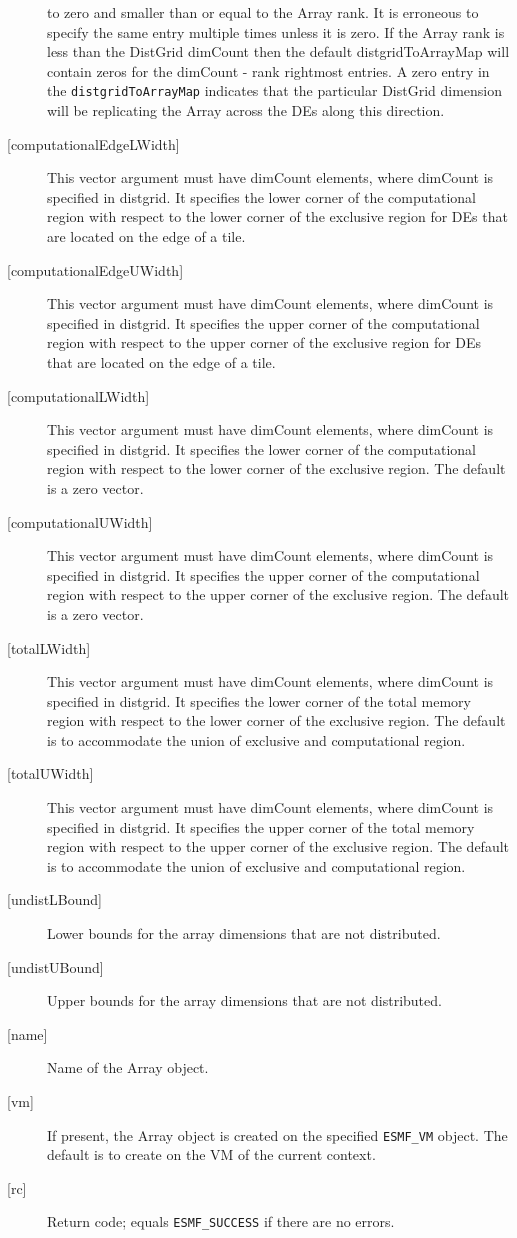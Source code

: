 \begin{description}
   to zero and smaller than or equal to the Array rank. It is erroneous
   to specify the same entry multiple times unless it is zero.
   If the Array rank is less than the DistGrid dimCount then the default
   distgridToArrayMap will contain zeros for the dimCount - rank
   rightmost entries. A zero entry in the {\tt distgridToArrayMap}
   indicates that the particular DistGrid dimension will be replicating
   the Array across the DEs along this direction.
   \item[{[computationalEdgeLWidth]}]
   This vector argument must have dimCount elements, where dimCount is
   specified in distgrid. It specifies the lower corner of the computational
   region with respect to the lower corner of the exclusive region for DEs
   that are located on the edge of a tile.
   \item[{[computationalEdgeUWidth]}]
   This vector argument must have dimCount elements, where dimCount is
   specified in distgrid. It specifies the upper corner of the computational
   region with respect to the upper corner of the exclusive region for DEs
   that are located on the edge of a tile.
   \item[{[computationalLWidth]}]
   This vector argument must have dimCount elements, where dimCount is
   specified in distgrid. It specifies the lower corner of the computational
   region with respect to the lower corner of the exclusive region.
   The default is a zero vector.
   \item[{[computationalUWidth]}]
   This vector argument must have dimCount elements, where dimCount is
   specified in distgrid. It specifies the upper corner of the computational
   region with respect to the upper corner of the exclusive region.
   The default is a zero vector.
   \item[{[totalLWidth]}]
   This vector argument must have dimCount elements, where dimCount is
   specified in distgrid. It specifies the lower corner of the total memory
   region with respect to the lower corner of the exclusive region.
   The default is to accommodate the union of exclusive and computational
   region.
   \item[{[totalUWidth]}]
   This vector argument must have dimCount elements, where dimCount is
   specified in distgrid. It specifies the upper corner of the total memory
   region with respect to the upper corner of the exclusive region.
   The default is to accommodate the union of exclusive and computational
   region.
   \item[{[undistLBound]}]
   Lower bounds for the array dimensions that are not distributed.
   \item[{[undistUBound]}]
   Upper bounds for the array dimensions that are not distributed.
   \item[{[name]}]
   Name of the Array object.
   \item[{[vm]}]
   If present, the Array object is created on the specified
   {\tt ESMF\_VM} object. The default is to create on the VM of the
   current context.
   \item[{[rc]}]
   Return code; equals {\tt ESMF\_SUCCESS} if there are no errors.
   \end{description}
   
